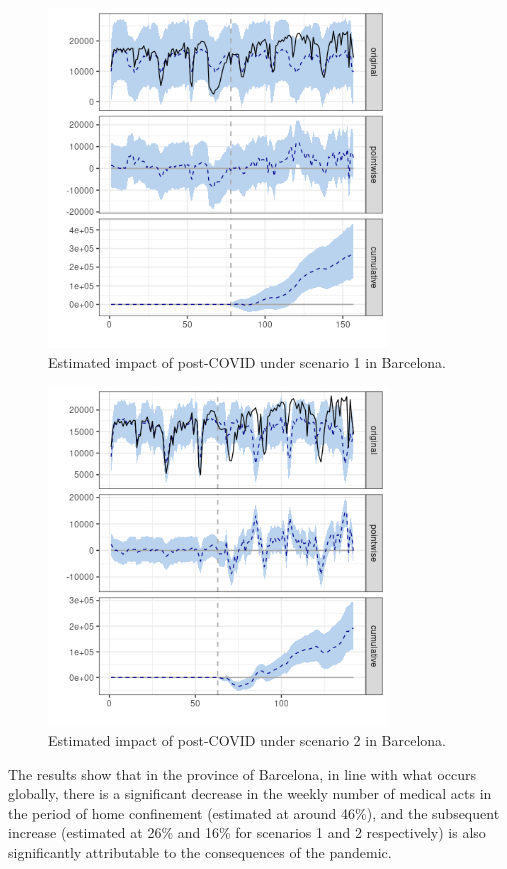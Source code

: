 \documentclass[9pt]{osa-supplemental-document}
\begin{document}
\begin{center}
\begin{figure}[H]
\includegraphics[width=9cm]{global_post_scen1_Barcelona.png}\caption{Estimated impact of post-COVID under scenario 1 in Barcelona.}
\end{figure}
\end{center}

\begin{center}
  \begin{figure}[H]
    \includegraphics[width=9cm]{global_post_scen2_Barcelona.png}\caption{Estimated impact of post-COVID under scenario 2 in Barcelona.}
  \end{figure}
  \end{center}

The results show that in the province of Barcelona, in line with what occurs globally, there is a significant decrease in the weekly number of medical acts in the period of home confinement (estimated at around 46\%), and the subsequent increase (estimated at 26\% and 16\% for scenarios 1 and 2 respectively) is also significantly attributable to the consequences of the pandemic.
\end{document}
